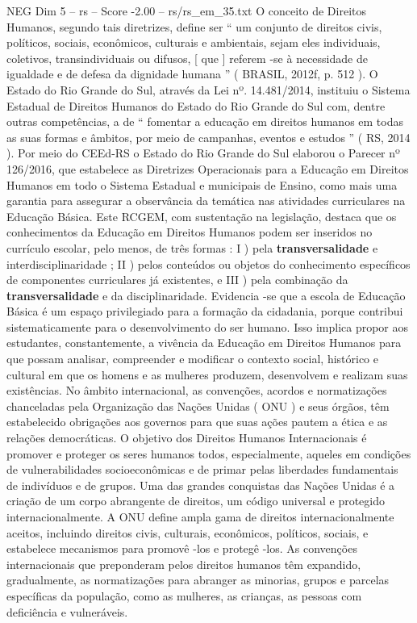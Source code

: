 \begin{textsample}{NEG Dim 5 – rs – Score -2.00 – rs/rs\_em\_35.txt}
O conceito de Direitos Humanos, segundo tais diretrizes, define ser “ um conjunto de direitos civis, políticos, sociais, econômicos, culturais e ambientais, sejam eles individuais, coletivos, transindividuais ou difusos, [ que ] referem -se à necessidade de igualdade e de defesa da dignidade humana ” ( BRASIL, 2012f, p. 512 ).
O Estado do Rio Grande do Sul, através da Lei nº. 14.481/2014, instituiu o Sistema Estadual de Direitos Humanos do Estado do Rio Grande do Sul com, dentre outras competências, a de “ fomentar a educação em direitos humanos em todas as suas formas e âmbitos, por meio de campanhas, eventos e estudos ” ( RS, 2014 ).
Por meio do CEEd-RS o Estado do Rio Grande do Sul elaborou o Parecer nº 126/2016, que estabelece as Diretrizes Operacionais para a Educação em Direitos Humanos em todo o Sistema Estadual e municipais de Ensino, como mais uma garantia para assegurar a observância da temática nas atividades curriculares na Educação Básica.
Este RCGEM, com sustentação na legislação, destaca que os conhecimentos da Educação em Direitos Humanos podem ser inseridos no currículo escolar, pelo menos, de três formas : I ) pela \textbf{transversalidade} e interdisciplinaridade ; II ) pelos conteúdos ou objetos do conhecimento específicos de componentes curriculares já existentes, e III ) pela combinação da \textbf{transversalidade} e da disciplinaridade.
Evidencia -se que a escola de Educação Básica é um espaço privilegiado para a formação da cidadania, porque contribui sistematicamente para o desenvolvimento do ser humano.
Isso implica propor aos estudantes, constantemente, a vivência da Educação em Direitos Humanos para que possam analisar, compreender e modificar o contexto social, histórico e cultural em que os homens e as mulheres produzem, desenvolvem e realizam suas existências.
No âmbito internacional, as convenções, acordos e normatizações chanceladas pela Organização das Nações Unidas ( ONU ) e seus órgãos, têm estabelecido obrigações aos governos para que suas ações pautem a ética e as relações democráticas.
O objetivo dos Direitos Humanos Internacionais é promover e proteger os seres humanos todos, especialmente, aqueles em condições de vulnerabilidades socioeconômicas e de primar pelas liberdades fundamentais de indivíduos e de grupos.
Uma das grandes conquistas das Nações Unidas é a criação de um corpo abrangente de direitos, um código universal e protegido internacionalmente.
A ONU define ampla gama de direitos internacionalmente aceitos, incluindo direitos civis, culturais, econômicos, políticos, sociais, e estabelece mecanismos para promovê -los e protegê -los.
As convenções internacionais que preponderam pelos direitos humanos têm expandido, gradualmente, as normatizações para abranger as minorias, grupos e parcelas específicas da população, como as mulheres, as crianças, as pessoas com deficiência e vulneráveis.

\end{textsample}

